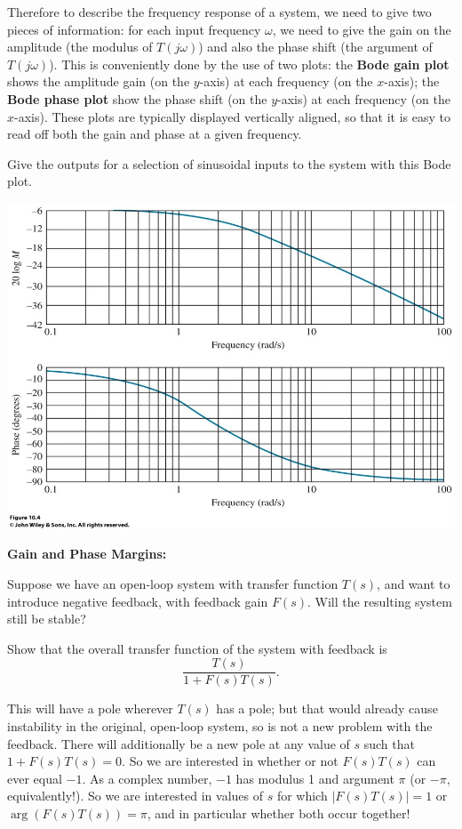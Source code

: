 \documentclass{article}
\begin{document}
Therefore to describe the frequency response of a system, we need to give two pieces of information: for each input frequency $\omega$, we need to give the gain on the amplitude (the modulus of $T(j\omega)$) and also the phase shift (the argument of $T(j\omega)$). This is conveniently done by the use of two plots: the \textbf{Bode gain plot} shows the amplitude gain (on the $y$-axis) at each frequency (on the $x$-axis); the \textbf{Bode phase plot} show the phase shift (on the $y$-axis) at each frequency (on the $x$-axis). These plots are typically displayed vertically aligned, so that it is easy to read off both the gain and phase at a given frequency.\bigskip


Give the outputs for a selection of sinusoidal inputs to the system with this Bode plot.
\begin{center}
	\includegraphics[scale=0.9]{BodeExample.jpg}
\end{center}


\clearpage



\textbf{Gain and Phase Margins:}\bigskip


Suppose we have an open-loop system with transfer function $T(s)$, and want to introduce negative feedback, with feedback gain $F(s)$. Will the resulting system still be stable?

Show that the overall transfer function of the system with feedback is
\[\frac{T(s)}{1+F(s)T(s)}.\]
\vfill

This will have a pole wherever $T(s)$ has a pole; but that would already cause instability in the original, open-loop system, so is not a new problem with the feedback. There will additionally be a new pole at any value of $s$ such that $1+F(s)T(s)=0$. So we are interested in whether or not $F(s)T(s)$ can ever equal $-1$. As a complex number, $-1$ has modulus 1 and argument $\pi$ (or $-\pi$, equivalently!). So we are interested in values of $s$ for which $|F(s)T(s)|=1$ or $\arg(F(s)T(s))=\pi$, and in particular whether both occur together!
\end{document}
